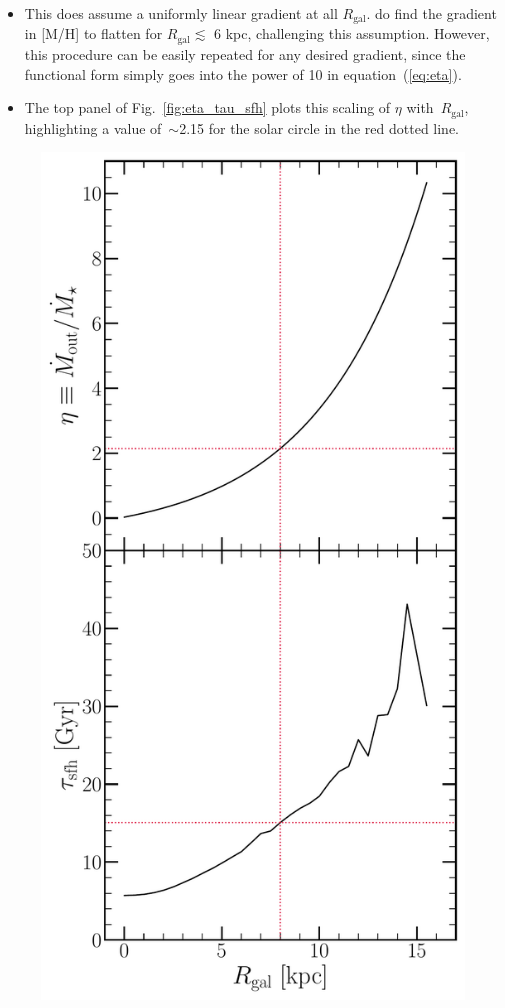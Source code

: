 \documentclass[fleqn, usenatbib]{mnras}
\newcommand{\refp}[1]{(\ref{#1})}
\begin{document}
\begin{itemize}
	\item This does assume a uniformly linear gradient at all $R_\text{gal}$. 
	\citet{Hayden2014} do find the gradient in [M/H] to flatten for 
	$R_\text{gal}\lesssim$ 6 kpc, challenging this assumption. However, this 
	procedure can be easily repeated for any desired gradient, since the 
	functional form simply goes into the power of 10 in equation~\refp{eq:eta}. 

	\item The top panel of Fig.~\ref{fig:eta_tau_sfh} plots this scaling of 
	$\eta$ with~$R_\text{gal}$, highlighting a value of~$\sim$2.15 for the 
	solar circle in the red dotted line. 
\end{itemize} 

\begin{figure} 
\centering 
\includegraphics[scale = 0.65]{eta_tau_sfh.pdf} 

\end{figure}
\end{document}
